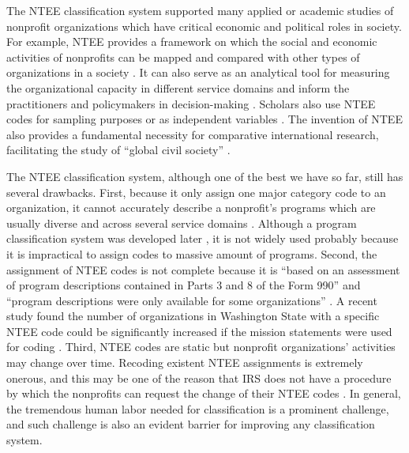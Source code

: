 \documentclass[11pt]{article}
\begin{document}
The NTEE classification system supported many applied or academic studies of nonprofit organizations which have critical economic and political roles in society. For example, NTEE provides a framework on which the social and economic activities of nonprofits can be mapped and compared with other types of organizations in a society \parencite[e.g.,][]{RoegerNonprofitSectorIts2015}. It can also serve as an analytical tool for measuring the organizational capacity in different service domains and inform the practitioners and policymakers in decision-making \parencite{Hodgkinsonnewresearchplanning1991}. Scholars also use NTEE codes for sampling purposes \parencite[e.g.,][]{OktenDeterminantsdonationsprivate2000,CarmanEvaluationCapacityNonprofit2010} or as independent variables \parencite{SloanEffectsNonprofitAccountability2009}. The invention of NTEE also provides a fundamental necessity for comparative international research, facilitating the study of ``global civil society'' \parencite{VakilConfrontingclassificationproblem1997,Salamonsearchnonprofitsector1992,Salamoninternationalclassificationnonprofit1996,HodgkinsonMappingnonprofitsector1990}.

The NTEE classification system, although one of the best we have so far, still has several drawbacks. First, because it only assign one major category code to an organization, it cannot accurately describe a nonprofit's programs which are usually diverse and across several service domains \parencite[303]{GronbjergUsingNTEEclassify1994}. Although a program classification system was developed later \parencite{LampkinIntroducingNonprofitProgram2001}, it is not widely used probably because it is impractical to assign codes to massive amount of programs. Second, the assignment of NTEE codes is not complete because it is ``based on an assessment of program descriptions contained in Parts 3 and 8 of the Form 990'' and ``program descriptions were only available for some organizations'' \parencite[16]{NationalCenterforCharitableStatisticsGuideUsingNCCS2006}. A recent study found the number of organizations in Washington State with a specific NTEE code could be significantly increased if the mission statements were used for coding \parencite{FyallNTEECodesOpportunities2018}. Third, NTEE codes are static but nonprofit organizations' activities may change over time. Recoding existent NTEE assignments is extremely onerous, and this may be one of the reason that IRS does not have a procedure by which the nonprofits can request the change of their NTEE codes \parencite{USInternalRevenueServiceIRSStaticFiles2013}. In general, the tremendous human labor needed for classification is a prominent challenge, and such challenge is also an evident barrier for improving any classification system.
\end{document}
